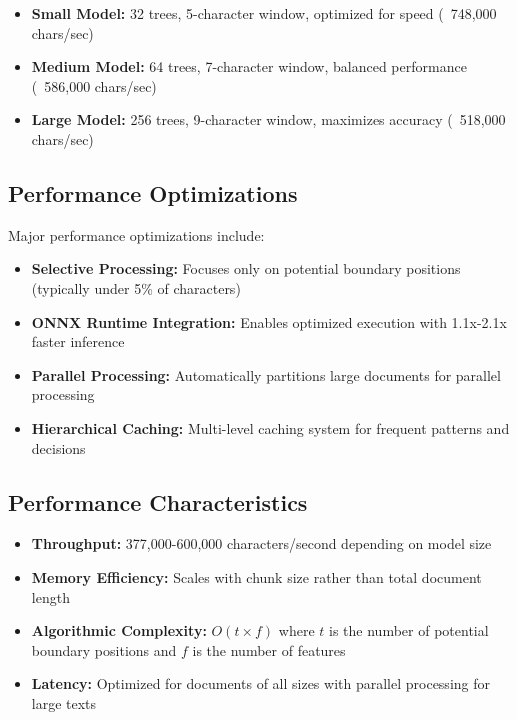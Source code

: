 \begin{itemize}
\item \textbf{Small Model:} 32 trees, 5-character window, optimized for speed (~748,000 chars/sec)
\item \textbf{Medium Model:} 64 trees, 7-character window, balanced performance (~586,000 chars/sec)
\item \textbf{Large Model:} 256 trees, 9-character window, maximizes accuracy (~518,000 chars/sec)
\end{itemize}



\subsection{Performance Optimizations}

Major performance optimizations include:

\begin{itemize}
\item \textbf{Selective Processing:} Focuses only on potential boundary positions (typically under 5\% of characters)
\item \textbf{ONNX Runtime Integration:} Enables optimized execution with 1.1x-2.1x faster inference
\item \textbf{Parallel Processing:} Automatically partitions large documents for parallel processing
\item \textbf{Hierarchical Caching:} Multi-level caching system for frequent patterns and decisions
\end{itemize}

\subsection{Performance Characteristics}

\begin{itemize}
\item \textbf{Throughput:} 377,000-600,000 characters/second depending on model size
\item \textbf{Memory Efficiency:} Scales with chunk size rather than total document length
\item \textbf{Algorithmic Complexity:} $O(t \times f)$ where $t$ is the number of potential boundary positions and $f$ is the number of features
\item \textbf{Latency:} Optimized for documents of all sizes with parallel processing for large texts
\end{itemize}


